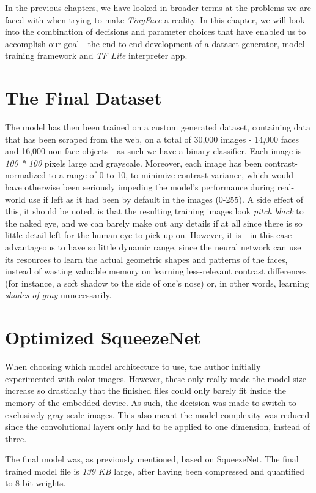 In the previous chapters, we have looked in broader terms at the problems we are faced with when trying to make \textit{TinyFace} a reality. In this chapter, we will look into the combination of decisions and parameter choices that have enabled us to accomplish our goal - the end to end development of a dataset generator, model training framework and \textit{TF Lite} interpreter app.

\section{The Final Dataset}
The model has then been trained on a custom generated dataset, containing data that has been scraped from the web, on a total of 30,000 images - 14,000 faces and 16,000 non-face objects - as such we have a binary classifier. Each image is \textit{100 * 100} pixels large and grayscale. Moreover, each image has been contrast-normalized to a range of 0 to 10, to minimize contrast variance, which would have otherwise been seriously impeding the model's performance during real-world use if left as it had been by default in the images (0-255). A side effect of this, it should be noted, is that the resulting training images look \textit{pitch black} to the naked eye, and we can barely make out any details if at all since there is so little detail left for the human eye to pick up on. However, it is - in this case - advantageous to have so little dynamic range, since the neural network can use its resources to learn the actual geometric shapes and patterns of the faces, instead of wasting valuable memory on learning less-relevant contrast differences (for instance, a soft shadow to the side of one's nose) or, in other words, learning \textit{shades of gray} unnecessarily. \par

\section{Optimized SqueezeNet}
When choosing which model architecture to use, the author initially experimented with color images. However, these only really made the model size increase so drastically that the finished files could only barely fit inside the memory of the embedded device. As such, the decision was made to switch to exclusively gray-scale images. This also meant the model complexity was reduced since the convolutional layers only had to be applied to one dimension, instead of three. \par
The final model was, as previously mentioned, based on SqueezeNet. The final trained model file is \textit{139 KB} large, after having been compressed and quantified to 8-bit weights. \par

